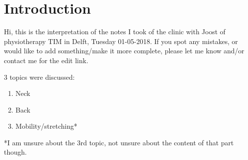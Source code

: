 \section{Introduction}\label{sec:introduction}
Hi, this is the interpretation of the notes I took of the clinic with Joost of physiotherapy TIM in Delft, Tuesday 01-05-2018. If you spot any mistakes, or would like to add something/make it more complete, please let me know and/or contact me for the edit link.

3 topics were discussed:
\begin{enumerate}
    \item Neck
    \item Back
    \item Mobility/stretching*
\end{enumerate}

*I am unsure about the 3rd topic, not unsure about the content of that part though.
